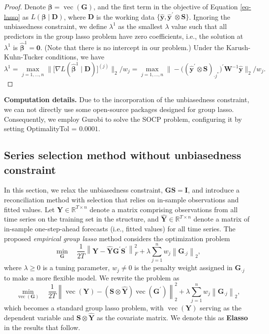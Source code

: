 \documentclass[
  11pt]{article}
\theoremstyle{plain}
\theoremstyle{remark}
\begin{document}
\begin{proof}
Denote \(\bm{\beta} = \operatorname{vec}(\bm{G})\), and the first term
in the objective of Equation \eqref{eq-lasso} as
\(L\left(\bm{\beta} \mid \bm{D}\right)\), where \(\bm{D}\) is the
working data
\(\{\hat{\bm{y}} , \hat{\bm{y}}^{\prime} \otimes \bm{S}\}\). Ignoring
the unbiasedness constraint, we define \(\lambda^{1}\) as the smallest
\(\lambda\) value such that all predictors in the group lasso problem
have zero coefficients, i.e., the solution at \(\lambda^{1}\) is
\(\hat{\bm{\beta}}^{1}=\bm{0}\). (Note that there is no intercept in our
problem.) Under the Karush-Kuhn-Tucker conditions, we have \[
\lambda^{1}
 = \max_{j=1, \ldots, n}\big\|\big[\nabla L(\hat{\bm{\beta}}^{1} \mid \bm{D})\big]^{(j)}\big\|_2 / w_j
 = \max_{j=1, \ldots, n}\big\|-\big((\hat{\bm{y}}^{\prime} \otimes \bm{S})_{\cdot j^{*}}\big)^{\prime} \bm{W}^{-1} \hat{\bm{y}}\big\|_2 / w_j.
\]
\end{proof}

\textbf{Computation details.} Due to the incorporation of the
unbiasedness constraint, we can not directly use some open-source
packages designed for group lasso. Consequently, we employ Gurobi to
solve the SOCP problem, configuring it by setting OptimalityTol =
\(0.0001\).

\subsection{Series selection method without unbiasedness
constraint}\label{sec-unconstrained}

In this section, we relax the unbiasedness constraint,
\(\bm{G}\bm{S} = \bm{I}\), and introduce a reconciliation method with
selection that relies on in-sample observations and fitted values. Let
\(\bm{Y} \in \mathbb{R}^{T \times n}\) denote a matrix comprising
observations from all time series on the training set in the structure,
and \(\hat{\bm{Y}} \in \mathbb{R}^{T \times n}\) denote a matrix of
in-sample one-step-ahead forecasts (i.e., fitted values) for all time
series. The proposed \emph{empirical group lasso} method considers the
optimization problem \[
\min_{\bm{G}} \quad \frac{1}{2 T} \left\|\bm{Y}-\hat{\bm{Y}} \bm{G}^{\prime} \bm{S}^{\prime}\right\|_F^2 + \lambda \sum_{j=1}^n w_j \left\|\bm{G}_{\cdot j}\right\|_2,
\] where \(\lambda \geq 0\) is a tuning parameter, \(w_j \neq 0\) is the
penalty weight assigned in \(\bm{G}_{\cdot j}\) to make a more flexible
model. We rewrite the problem as \[
\min_{\operatorname{vec}(\bm{G})} \quad \frac{1}{2 T} \left\|\operatorname{vec}(\bm{Y})-(\bm{S} \otimes \hat{\bm{Y}}) \operatorname{vec}\left(\bm{G}^{\prime}\right)\right\|_2^2 + \lambda \sum_{j=1}^n w_j \left\|\bm{G}_{\cdot j}\right\|_2,
\] which becomes a standard group lasso problem, with
\(\operatorname{vec}(\bm{Y})\) serving as the dependent variable and
\(\bm{S} \otimes \hat{\bm{Y}}\) as the covariate matrix. We denote this
as \textbf{Elasso} in the results that follow.
\end{document}
